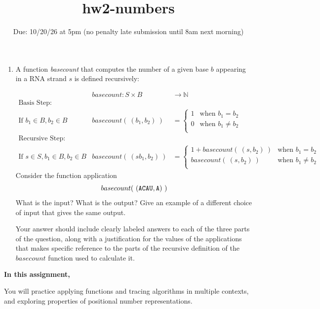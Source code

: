 \begin{enumerate}[labelindent=0pt, leftmargin=0pt]
\begin{enumerate}
\item  A function \textit{basecount} that computes the number of a given base 
$b$ appearing in a RNA strand $s$ is defined recursively:
    
\[
\begin{array}{llll}
& \textit{basecount} : S \times B & \to \mathbb{N} &\\
\textrm{Basis Step:} &  \\
\textrm{If } b_1 \in B, b_2 \in B & \textit{basecount}(~(b_1, b_2)~) & = 
        \begin{cases}
            1 & \textrm{when } b_1 = b_2 \\
            0 & \textrm{when } b_1 \neq b_2 \\
        \end{cases}& \\
\textrm{Recursive Step:} & \\
\textrm{If } s \in S, b_1 \in B, b_2 \in B &\textit{basecount}(~(s b_1, b_2)~) & =
        \begin{cases}
            1 + \textit{basecount}(~(s, b_2)~) & \textrm{when } b_1 = b_2 \\
            \textit{basecount}(~(s, b_2)~) & \textrm{when } b_1 \neq b_2 \\
        \end{cases} &
\end{array}
\]
Consider the function application 
\[
  basecount( ~(\texttt{A}\texttt{C}\texttt{A}\texttt{U}, \texttt{A})~)
\]
What is the input?  What is the output? Give an example of a different choice of input that 
gives the same output.

Your answer should include clearly labeled answers to each of the three parts of the question, 
along with a justification for the values of the applications that makes specific reference to 
the parts of the recursive definition of the $basecount$ function used to calculate it.
\end{enumerate}
\end{enumerate}
\newpage

\title{hw2-numbers}
\date{Due: 10/20/26 at 5pm (no penalty late submission until 8am next morning)}

\maketitle
\thispagestyle{fancy}


{\bf In this assignment,}

You will practice applying functions and tracing algorithms in multiple contexts, 
and exploring properties of positional number representations.

